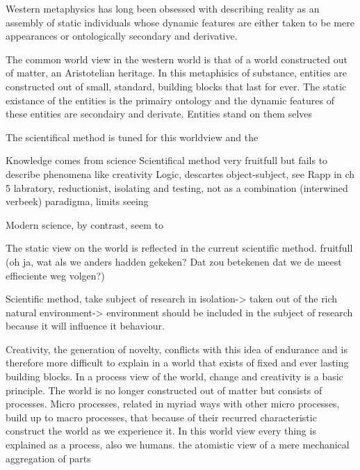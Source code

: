 Western metaphysics has long been obsessed with describing reality as an assembly of static individuals whose dynamic features are either taken to be mere appearances or ontologically secondary and derivative. 

The common world view in the western world is that of a world constructed out of matter, an Aristotelian heritage. In this metaphisics of substance, entities are constructed out of small, standard, building blocks that last for ever. 
The static existance of the entities is the primairy ontology and the dynamic features of these entities are secondairy and derivate.
Entities stand on them selves

The scientifical method is tuned for this worldview and the 

Knowledge comes from science
Scientifical method very fruitfull but fails to describe phenomena like creativity
Logic, descartes object-subject, see Rapp in ch 5
labratory, reductionist, isolating and testing, not as a combination (interwined verbeek)
paradigma, limits seeing

Modern science, by contrast, seem to \cite[chapter 5]{rapp1990whitehad}


The static view on the world is reflected in the current scientific method.
fruitfull (oh ja, wat als we anders hadden gekeken? Dat zou betekenen dat we de meest effieciente weg volgen?)

Scientific method, take subject of research in isolation-> taken out of the rich natural environment-> environment should be included in the subject of research because it will influence it behaviour.

Creativity, the generation of novelty, conflicts with this idea of endurance and is therefore more difficult to explain in a world that exists of fixed and ever lasting building blocks.
In a process view of the world, change and creativity is a basic principle. The world is no longer constructed out of matter but consists of processes. Micro processes, related in myriad ways with other micro processes, build up to macro processes, that because of their recurred characteristic construct the world as we experience it. In this world view every thing is explained as a process, also we humans. 
\cite[ch 5]{rapp1990whitehead}
the atomistic view of a mere mechanical aggregation of parts


